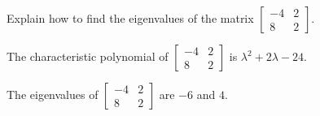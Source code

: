 
\begin{exerciseStatement}


Explain how to find the eigenvalues of the matrix \( \left[\begin{array}{cc}
-4 & 2 \\
8 & 2
\end{array}\right] \).


\end{exerciseStatement}
    
\begin{exerciseAnswer} 


The characteristic polynomial of \( \left[\begin{array}{cc}
-4 & 2 \\
8 & 2
\end{array}\right] \) is \( \lambda^{2} + 2 \lambda - 24 \).



The eigenvalues of \( \left[\begin{array}{cc}
-4 & 2 \\
8 & 2
\end{array}\right] \) are \( -6 \) and \( 4 \).


\end{exerciseAnswer}
    
